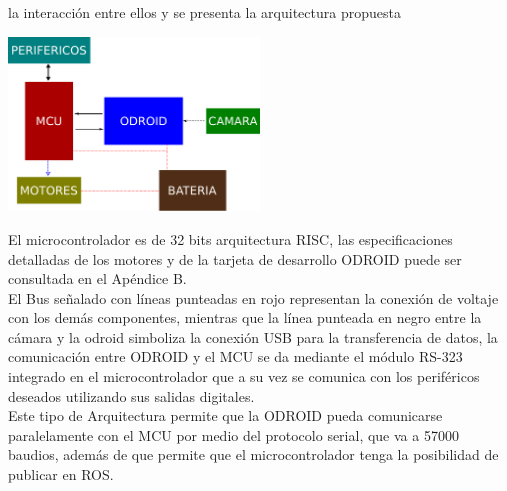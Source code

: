 la interacción entre ellos y se presenta la arquitectura propuesta
\begin{center}
	\includegraphics[width=0.5\textwidth]{Contenido/Cuerpo/Capitulo5/Fig13.eps}
	\label{Fig1}
\end{center}
El microcontrolador es de 32 bits arquitectura RISC, las especificaciones detalladas de los motores y de la tarjeta de desarrollo
ODROID puede ser consultada en el Apéndice B.\\
El Bus señalado con líneas punteadas en rojo representan la conexión de voltaje con los demás componentes, mientras que la línea punteada en negro entre la cámara y la odroid
simboliza la conexión USB para la transferencia de datos, la comunicación entre ODROID y el MCU se da mediante el módulo RS-323 integrado en el microcontrolador que a su vez
se comunica con los periféricos deseados utilizando sus salidas digitales.\\
Este tipo de Arquitectura permite que la ODROID pueda comunicarse paralelamente con el MCU por medio del protocolo serial, que va
a 57000 baudios, además de que permite que el microcontrolador tenga la posibilidad de publicar en ROS.



